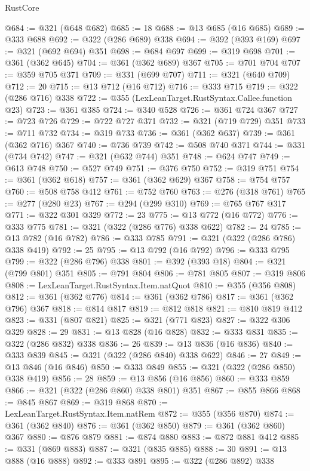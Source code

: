\begin{lexlean}{RustCore}
\begin{coremodule}
@684 := @321 (@648 @682)
@685 := 18
@688 := @13 @685 (@16 @685)
@689 := @333 @688
@692 := @322 (@286 @689) @338
@694 := @392 (@393 @169)
@697 := @321 (@692 @694) @351
@698 := @684 @697
@699 := @319 @698
@701 := @361 (@362 @645)
@704 := @361 (@362 @689) @367
@705 := @701 @704
@707 := @359 @705 @371
@709 := @331 (@699 @707)
@711 := @321 (@640 @709)
@712 := 20
@715 := @13 @712 (@16 @712)
@716 := @333 @715
@719 := @322 (@286 @716) @338
@722 := @355 (LexLeanTarget.RustSyntax.Callee.function @23)
@723 := @361 @385
@724 := @340 @528
@726 := @361 @724 @367
@727 := @723 @726
@729 := @722 @727 @371
@732 := @321 (@719 @729) @351
@733 := @711 @732
@734 := @319 @733
@736 := @361 (@362 @637)
@739 := @361 (@362 @716) @367
@740 := @736 @739
@742 := @508 @740 @371
@744 := @331 (@734 @742)
@747 := @321 (@632 @744) @351
@748 := @624 @747
@749 := @613 @748
@750 := @527 @749
@751 := @376 @750
@752 := @319 @751
@754 := @361 (@362 @618)
@757 := @361 (@362 @629) @367
@758 := @754 @757
@760 := @508 @758 @412
@761 := @752 @760
@763 := @276 (@318 @761)
@765 := @277 (@280 @23)
@767 := @294 (@299 @310)
@769 := @765 @767 @317
@771 := @322 @301 @329
@772 := 23
@775 := @13 @772 (@16 @772)
@776 := @333 @775
@781 := @321 (@322 (@286 @776) @338 @622)
@782 := 24
@785 := @13 @782 (@16 @782)
@786 := @333 @785
@791 := @321 (@322 (@286 @786) @338 @419)
@792 := 25
@795 := @13 @792 (@16 @792)
@796 := @333 @795
@799 := @322 (@286 @796) @338
@801 := @392 (@393 @18)
@804 := @321 (@799 @801) @351
@805 := @791 @804
@806 := @781 @805
@807 := @319 @806
@808 := LexLeanTarget.RustSyntax.Item.natQuot
@810 := @355 (@356 @808)
@812 := @361 (@362 @776)
@814 := @361 (@362 @786)
@817 := @361 (@362 @796) @367
@818 := @814 @817
@819 := @812 @818
@821 := @810 @819 @412
@823 := @331 (@807 @821)
@825 := @321 (@771 @823)
@827 := @322 @306 @329
@828 := 29
@831 := @13 @828 (@16 @828)
@832 := @333 @831
@835 := @322 (@286 @832) @338
@836 := 26
@839 := @13 @836 (@16 @836)
@840 := @333 @839
@845 := @321 (@322 (@286 @840) @338 @622)
@846 := 27
@849 := @13 @846 (@16 @846)
@850 := @333 @849
@855 := @321 (@322 (@286 @850) @338 @419)
@856 := 28
@859 := @13 @856 (@16 @856)
@860 := @333 @859
@866 := @321 (@322 (@286 @860) @338 @801) @351
@867 := @855 @866
@868 := @845 @867
@869 := @319 @868
@870 := LexLeanTarget.RustSyntax.Item.natRem
@872 := @355 (@356 @870)
@874 := @361 (@362 @840)
@876 := @361 (@362 @850)
@879 := @361 (@362 @860) @367
@880 := @876 @879
@881 := @874 @880
@883 := @872 @881 @412
@885 := @331 (@869 @883)
@887 := @321 (@835 @885)
@888 := 30
@891 := @13 @888 (@16 @888)
@892 := @333 @891
@895 := @322 (@286 @892) @338

\end{coremodule}
\end{lexlean}
